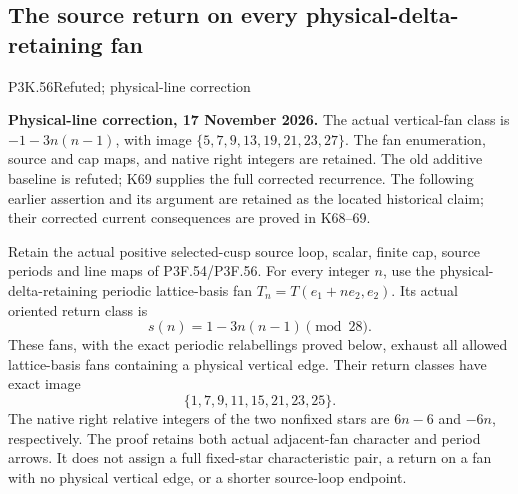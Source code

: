 \subsection{The source return on every physical-delta-retaining fan}
\begin{statement}{P3K.56}{Refuted; physical-line correction}\par\noindent\textbf{Physical-line correction, 17 November 2026.} The actual vertical-fan class is \(-1-3n(n-1)\), with image \(\{5,7,9,13,19,21,23,27\}\). The fan enumeration, source and cap maps, and native right integers are retained. The old additive baseline is refuted; K69 supplies the full corrected recurrence. The following earlier assertion and its argument are retained as the located historical claim; their corrected current consequences are proved in K68--69.\medskip\par 
Retain the actual positive selected-cusp source loop, scalar, finite
cap, source periods and line maps of P3F.54/P3F.56. For every integer
\(n\), use the physical-delta-retaining periodic lattice-basis fan
\(T_n=T(e_1+ne_2,e_2)\). Its actual oriented return class is
\[
                  s(n)=1-3n(n-1)\pmod{28}.
\]
These fans, with the exact periodic relabellings proved below,
exhaust all allowed lattice-basis fans containing a physical vertical
edge. Their return classes have exact image
\[
                     \{1,7,9,11,15,21,23,25\}.
\]
The native right relative integers of the two nonfixed stars are
\(6n-6\) and \(-6n\), respectively. The proof retains both actual
adjacent-fan character and period arrows. It does not assign a full
fixed-star characteristic pair, a return on a fan with no physical
vertical edge, or a shorter source-loop endpoint.
\end{statement}
